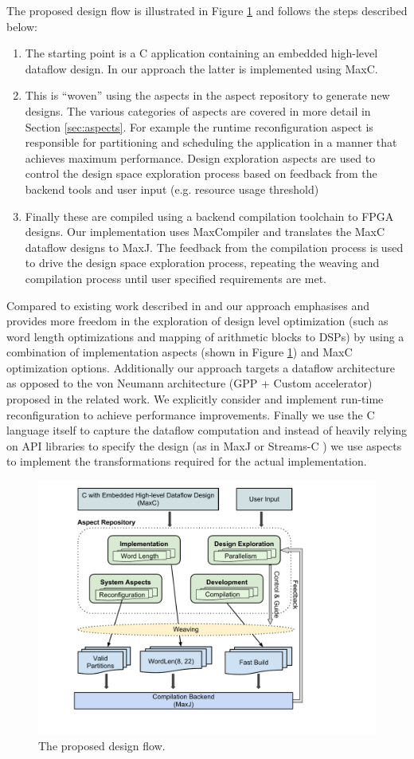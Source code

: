 The proposed design flow is illustrated in Figure
\ref{fig:design-flow} and follows the steps described below:
\begin{enumerate}
\item The starting point is a C application containing an embedded
  high-level dataflow design. In our approach the latter is
  implemented using MaxC.
\item This is ``woven'' using the aspects in the aspect repository to
  generate new designs. The various categories of aspects are covered
  in more detail in Section \ref{sec:aspects}. For example the
  runtime reconfiguration aspect is responsible for partitioning and
  scheduling the application in a manner that achieves maximum
  performance. Design exploration aspects are used to control the
  design space exploration process based on feedback from the backend
  tools and user input (e.g. resource usage threshold)
\item Finally these are compiled using a backend compilation toolchain
  to FPGA designs. Our implementation uses MaxCompiler and translates
  the MaxC dataflow designs to MaxJ.  The feedback from the
  compilation process is used to drive the design space exploration
  process, repeating the weaving and compilation process until user
  specified requirements are met.
\end{enumerate}

Compared to existing work described in
\cite{Cardoso:Teixeira:Alves:Nobre:Diniz:Cutinho:Luk:2012} and
\cite{cardoso2011new} our approach emphasises and provides more
freedom in the exploration of design level optimization (such as word
length optimizations and mapping of arithmetic blocks to DSPs) by
using a combination of implementation aspects (shown in Figure
\ref{fig:design-flow}) and MaxC optimization options.  Additionally
our approach targets a dataflow architecture as opposed to the von
Neumann architecture (GPP + Custom accelerator) proposed in the
related work. We explicitly consider and implement run-time
reconfiguration to achieve performance improvements. Finally we use
the C language itself to capture the dataflow computation and instead
of heavily relying on API libraries to specify the design (as in MaxJ
\cite{MaxelerTechnologies:2012} or Streams-C
\cite{Gokhale:Stone:Arnold:Kalinowski:2000}) we use aspects to
implement the transformations required for the actual implementation.

\begin{figure}[!h]
  \includegraphics[scale=0.51, trim=72 50 0 0]{figs/design-flow}
  \caption{The proposed design flow.}
  \label{fig:design-flow}
\end{figure}
